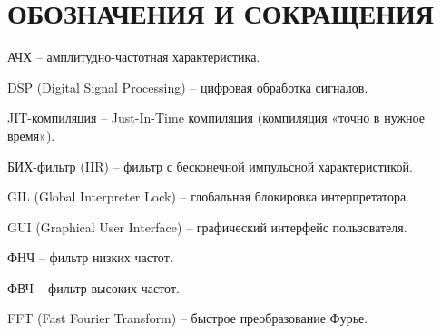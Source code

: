 \section*{ОБОЗНАЧЕНИЯ И СОКРАЩЕНИЯ}

АЧХ -- амплитудно-частотная характеристика.

DSP (Digital Signal Processing) -- цифровая обработка сигналов.

JIT-компиляция -- Just-In-Time компиляция (компиляция «точно в нужное время»).

БИХ-фильтр (IIR) -- фильтр с бесконечной импульсной характеристикой.

GIL (Global Interpreter Lock) -- глобальная блокировка интерпретатора.

GUI (Graphical User Interface) -- графический интерфейс пользователя.

ФНЧ -- фильтр низких частот.

ФВЧ -- фильтр высоких частот.

FFT (Fast Fourier Transform) -- быстрое преобразование Фурье.